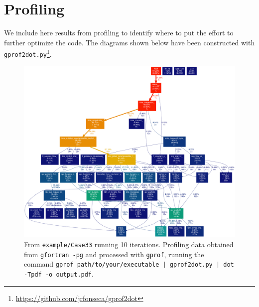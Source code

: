 \chapter{Profiling}\label{sec:profiling}

We include here results from profiling to identify where to put the effort to further optimize the code. The diagrams shown below have been constructed with {\tt gprof2dot.py}\footnote{\url{https://github.com/jrfonseca/gprof2dot}}.

\begin{figure}[H]
  \centering
  \includegraphics[clip,width=\textwidth]{figs/profiling.pdf}
  \caption{From {\tt example/Case33} running 10 iterations. Profiling data obtained from {\tt gfortran -pg} and processed with {\tt gprof}, running the command {\tt gprof path/to/your/executable | gprof2dot.py | dot -Tpdf -o output.pdf}.}
\end{figure}

